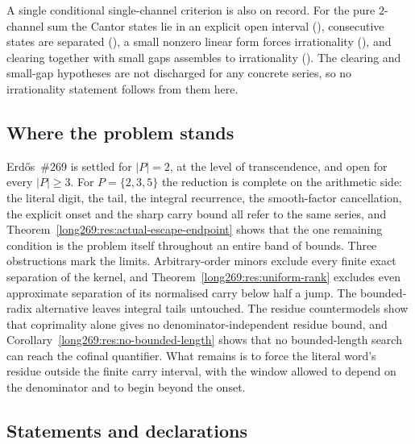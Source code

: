 \documentclass[11pt]{article}
\begin{document}
A single conditional single-channel criterion is also on record.  For the pure
$2$-channel sum the Cantor states lie in an explicit open interval
(),
consecutive states are separated
(), a small nonzero linear form forces irrationality
(),
and clearing together with small gaps assembles to irrationality
().
The clearing and small-gap hypotheses are not discharged for any concrete
series, so no irrationality statement follows from them here.

\subsection{Where the problem stands}

Erd\H{o}s~\#269 is settled for $|P|=2$, at the level of transcendence, and open
for every $|P|\ge3$.  For $P=\{2,3,5\}$ the reduction is complete on the
arithmetic side: the literal digit, the tail, the integral recurrence, the
smooth-factor cancellation, the explicit onset and the sharp carry bound all
refer to the same series, and Theorem~\ref{long269:res:actual-escape-endpoint} shows
that the one remaining condition is the problem itself throughout an entire
band of bounds.  Three obstructions mark the limits.  Arbitrary-order minors
exclude every finite exact separation of the kernel, and
Theorem~\ref{long269:res:uniform-rank} excludes even approximate separation of its
normalised carry below half a jump.  The bounded-radix alternative leaves
integral tails untouched.  The residue countermodels show that coprimality
alone gives no denominator-independent residue bound, and
Corollary~\ref{long269:res:no-bounded-length} shows that no bounded-length search can
reach the cofinal quantifier.  What remains is to force the literal word's
residue outside the finite carry interval, with the window allowed to depend on
the denominator and to begin beyond the onset.

\subsection*{Statements and declarations}
\end{document}
